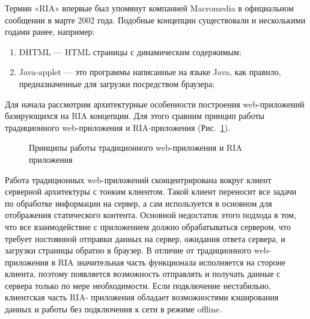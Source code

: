 Термин «RIA» впервые был упомянут компанией Macromedia в официальном сообщении в
марте 2002 года. Подобные концепции существовали и несколькими годами ранее, например:

\begin{enumerate}
\item DHTML --- HTML страницы с динамическим содержимым;
\item Java-applet --- это программы написанные на языке Java, как правило, предназначенные для загрузки посредством
браузера;
\end{enumerate}

Для начала рассмотрим архитектурные особенности построения web-приложений базирующихся 
на RIA концепции. Для этого сравним принцип работы традиционного web-приложения и
RIA-приложения (Рис.~\ref{ris:principlesRIA.png}).
\begin{figure}[ht]
\caption{Принципы работы традиционного web-приложения и RIA приложения}
\label{ris:principlesRIA.png}
\end{figure}

Работа традиционных web-приложений сконцентрирована вокруг клиент серверной архитектуры 
с тонким клиентом. Такой клиент переносит все задачи по обработке информации на сервер,
а сам используется в основном для отображения статического контента. Основной
недостаток этого подхода в том, что все взаимодействие с приложением должно
обрабатываться сервером, что требует постоянной отправки данных на сервер,
ожидания ответа сервера, и загрузки страницы обратно в браузер. В отличие от 
традиционного web-приложения в RIA значительная часть функционала исполняется на
стороне клиента, поэтому появляется возможность отправлять и получать данные с сервера
только по мере необходимости. Если подключение нестабильно, клиентская часть RIA-
приложения обладает возможностями кэширования данных и работы без подключения к сети в 
режиме offline.

